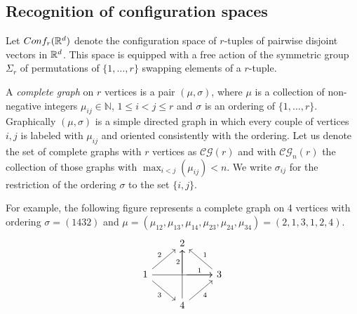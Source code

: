 \subsection{Recognition of configuration spaces}\label{ss:recognition}



Let $Conf_{r}(\mathbb{R}^{d})$ denote the configuration space of $r$-tuples of pairwise disjoint vectors in $\mathbb{R}^{d}$.
This space is equipped with a free action of the symmetric group $\Sigma_r$ of permutations of $\{1,\dots,r\}$ swapping elements of a $r$-tuple.


\begin{definition}
	A \textit{complete graph} on $r$ vertices is a pair $(\mu,\sigma)$, where $\mu$ is a collection of non-negative integers $\mu_{ij}\in\mathbb{N}$, $1 \leq i < j \leq r$
	and $\sigma$ is an ordering of
	$\{1,\dots,r\}$. Graphically $(\mu,\sigma)$ is a simple directed graph in which every couple of vertices $i,j$ is labeled with $\mu_{ij}$ and oriented consistently with the ordering.
	Let us denote the set of complete graphs with $r$ vertices as $\mathcal{CG}(r)$ and with $\mathcal{CG}_{n}(r)$ the collection of those graphs with $\max_{i<j}(\mu_{ij})< n$. We write $\sigma_{ij}$ for the restriction of the ordering $\sigma$ to the set $\{i,j\}$.
\end{definition}
	For example, the following figure represents a complete graph on 4 vertices with ordering $\sigma=(1432)$ and $\mu=(\mu_{12},\mu_{13},\mu_{14},\mu_{23},\mu_{24},\mu_{34})=(2,1,3,1,2,4)$.
	\begin{equation*}
		\begin{tikzcd}
			\ & 2 & \  \\
			1 \arrow[ur,"2"] \arrow[rr] \arrow[dr,"3"']& \arrow[r,"1"] \arrow[u,"2"] & 3 \arrow[ul,"1"']  \\
			\ & 4 \arrow[ur,"4"'] \arrow[uu] & \
		\end{tikzcd}
	\end{equation*}
	

